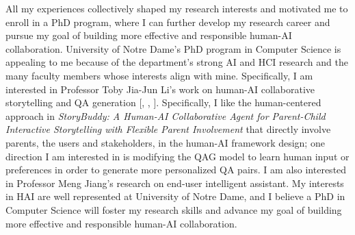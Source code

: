 


All my experiences collectively shaped my research interests and motivated me to enroll in a PhD program, where I can further develop my research career and pursue my goal of building more effective and responsible human-AI collaboration. 
University of Notre Dame's PhD program in Computer Science is appealing to me because of the department's strong AI and HCI research and the many faculty members whose interests align with mine. 
Specifically, I am interested in Professor Toby Jia-Jun Li's work on human-AI collaborative storytelling and QA generation [, , ]. Specifically, I like the human-centered approach in \textit{StoryBuddy: A Human-AI Collaborative Agent for Parent-Child Interactive Storytelling with Flexible Parent Involvement} that directly involve parents, the users and stakeholders, in the human-AI framework design; one direction I am interested in is modifying the QAG model to learn human input or preferences in order to generate more personalized QA pairs.
I am also interested in Professor Meng Jiang's research on end-user intelligent assistant.
My interests in HAI are well represented at University of Notre Dame, and I believe a PhD in Computer Science will foster my research skills and advance my goal of building more effective and responsible human-AI collaboration.
